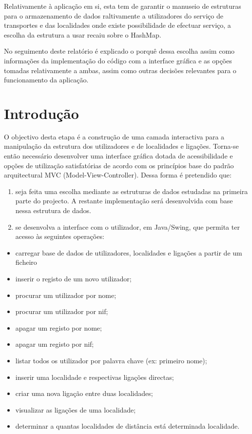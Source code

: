 \documentclass[a5paper,twocolumn, 11pt]{article}
\begin{document}
Relativamente à aplicação em si, esta tem de garantir o manuseio de estruturas para o armazenamento de dados raltivamente a utilizadores do serviço de transportes e das localidades onde existe possibilidade de efectuar serviço, a escolha da estrutura a usar recaiu sobre o HashMap. 

No seguimento deste relatório é explicado o porquê dessa escolha assim como informações da implementação do código com a interface gráfica e as opções tomadas relativamente a ambas, assim como outras decisões relevantes para o funcionamento da aplicação.


\clearpage
\section{Introdução}
O objectivo desta etapa é a construção de uma camada interactiva para a manipulação da estrutura dos utilizadores e de localidades e ligações. Torna-se então necessário desenvolver uma interface gráfica dotada de acessibilidade e opções de utilização satisfatórias de acordo com os princípios base do padrão arquitectural MVC (Model-View-Controller).
Dessa forma é pretendido que:

\begin{enumerate}
    \item{seja feita uma escolha mediante as estruturas de dados estudadas na primeira parte do projecto. A restante implementação será desenvolvida com base nessa estrutura de dados.}
    \item{se desenvolva a interface com o utilizador, em Java/Swing, que permita ter acesso às seguintes operações:}
\end{enumerate}
\begin{itemize}
    \item{carregar base de dados de utilizadores, localidades e ligações a partir de um ficheiro}
    \item{inserir o registo de um novo utilizador;}
    \item{procurar um utilizador por nome;}
    \item{procurar um utilizador por nif;}
    \item{apagar um registo por nome;}
    \item{apagar um registo por nif;}
    \item{listar todos os utilizador por palavra chave (ex: primeiro nome);}
    \item{inserir uma localidade e respectivas ligações directas;}
    \item{criar uma nova ligação entre duas localidades;}
    \item{visualizar as ligações de uma localidade;}
    \item{determinar a quantas localidades de distância está determinada localidade.}
\end{itemize}
\end{document}
